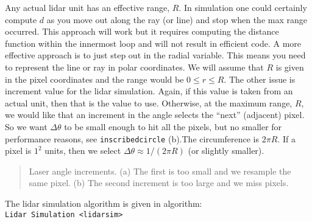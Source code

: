 Any actual lidar unit has an effective range, \(R\). In simulation one
could certainly compute \(d\) as you move out along the ray (or line)
and stop when the max range occurred. This approach will work but it
requires computing the distance function within the innermost loop and
will not result in efficient code. A more effective approach is to just
step out in the radial variable. This means you need to represent the
line or ray in polar coordinates. We will assume that \(R\) is given in
the pixel coordinates and the range would be \(0 \leq r \leq R\). The
other issue is increment value for the lidar simulation. Again, if this
value is taken from an actual unit, then that is the value to use.
Otherwise, at the maximum range, \(R\), we would like that an increment
in the angle selects the ``next'' (adjacent) pixel. So we want
\(\Delta \theta\) to be small enough to hit all the pixels, but no
smaller for performance reasons, see \texttt{inscribedcircle} (b).The
circumference is \(2\pi R\). If a pixel is \(1^2\) units, then we select
\(\Delta\theta \approx 1/(2\pi R)\) (or slightly smaller).

\begin{quote}
Laser angle increments. (a) The first is too small and we resample the
same pixel. (b) The second increment is too large and we miss pixels.
\end{quote}

The lidar simulation algorithm is given in algorithm:
\texttt{Lidar\ Simulation\ \textless{}lidarsim\textgreater{}}

